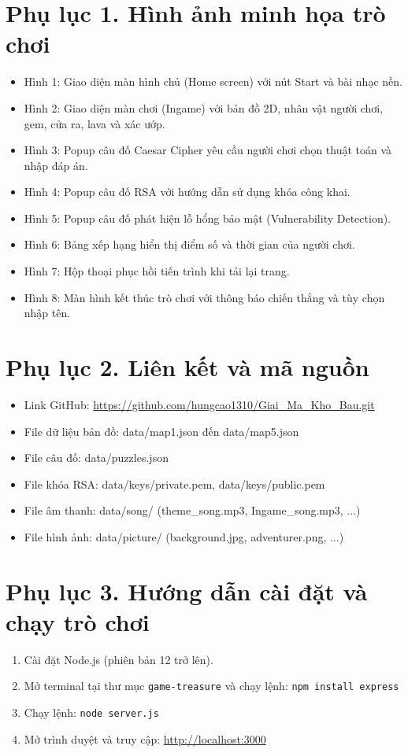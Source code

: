 \appendix
{}

\section*{Phụ lục 1. Hình ảnh minh họa trò chơi}

\begin{itemize}
    \item Hình 1: Giao diện màn hình chủ (Home screen) với nút Start và bài nhạc nền.
    \item Hình 2: Giao diện màn chơi (Ingame) với bản đồ 2D, nhân vật người chơi, gem, cửa ra, lava và xác ướp.
    \item Hình 3: Popup câu đố Caesar Cipher yêu cầu người chơi chọn thuật toán và nhập đáp án.
    \item Hình 4: Popup câu đố RSA với hướng dẫn sử dụng khóa công khai.
    \item Hình 5: Popup câu đố phát hiện lỗ hổng bảo mật (Vulnerability Detection).
    \item Hình 6: Bảng xếp hạng hiển thị điểm số và thời gian của người chơi.
    \item Hình 7: Hộp thoại phục hồi tiến trình khi tải lại trang.
    \item Hình 8: Màn hình kết thúc trò chơi với thông báo chiến thắng và tùy chọn nhập tên.
\end{itemize}

\section*{Phụ lục 2. Liên kết và mã nguồn}

\begin{itemize}
    \item Link GitHub: \url{https://github.com/hungcao1310/Giai_Ma_Kho_Bau.git}
    \item File dữ liệu bản đồ: data/map1.json đến data/map5.json
    \item File câu đố: data/puzzles.json
    \item File khóa RSA: data/keys/private.pem, data/keys/public.pem
    \item File âm thanh: data/song/ (theme\_song.mp3, Ingame\_song.mp3, ...)
    \item File hình ảnh: data/picture/ (background.jpg, adventurer.png, ...)
\end{itemize}

\section*{Phụ lục 3. Hướng dẫn cài đặt và chạy trò chơi}

\begin{enumerate}
    \item Cài đặt Node.js (phiên bản 12 trở lên).
    \item Mở terminal tại thư mục \texttt{game-treasure} và chạy lệnh: \texttt{npm install express}
    \item Chạy lệnh: \texttt{node server.js}
    \item Mở trình duyệt và truy cập: \url{http://localhost:3000}
\end{enumerate}
